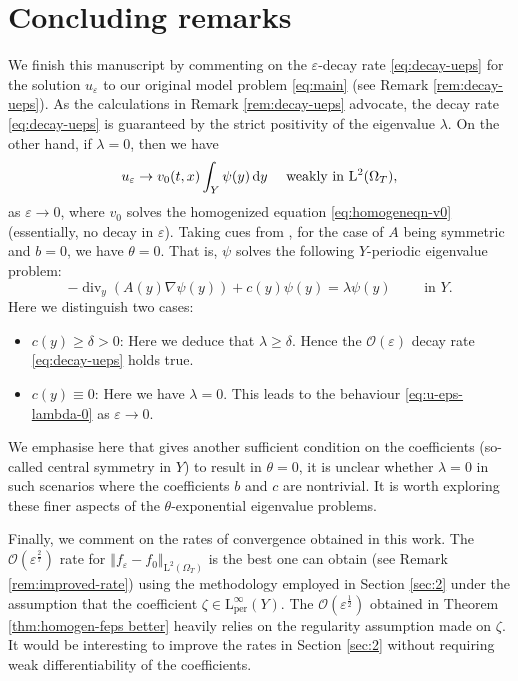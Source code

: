 \documentclass[preprint, 12pt]{amsart}
\numberwithin{equation}{section}
\numberwithin{equation}{section}
\newcommand{\eps}{\varepsilon}
\DeclareMathOperator{\dv}{div}
\begin{document}
\section{Concluding remarks}\label{sec:conclude}
We finish this manuscript by commenting on the $\eps$-decay rate \eqref{eq:decay-ueps} for the solution $u_\eps$ to our original model problem \eqref{eq:main} (see Remark \ref{rem:decay-ueps}). As the calculations in Remark \ref{rem:decay-ueps} advocate, the decay rate \eqref{eq:decay-ueps} is guaranteed by the strict positivity of the eigenvalue $\lambda$. On the other hand, if $\lambda=0$, then we have
\begin{equation}\label{eq:u-eps-lambda-0}
u_\eps \to v_0 (t,x) \int_Y \psi(y)\, {\rm d}y \quad \mbox{ weakly in }\mathrm L^2(\Omega_T),
\end{equation}
as $\eps\to0$, where $v_0$ solves the homogenized equation \eqref{eq:homogeneqn-v0} (essentially, no decay in $\eps$). Taking cues from \cite[Remark 2.2, page 737]{allaire2007homogenization}, for the case of $A$ being symmetric and $b=0$, we have $\theta=0$. That is, $\psi$ solves the following $Y$-periodic eigenvalue problem:
\[
-\dv_y ({A}(y)\nabla \psi(y)) + c(y) \psi(y) = \lambda \psi(y) \qquad \mbox{ in }Y.
\]
Here we distinguish two cases:
\begin{itemize}
\item $c(y)\ge \delta >0$: Here we deduce that $\lambda\ge \delta$. Hence the $\mathcal{O}(\eps)$ decay rate \eqref{eq:decay-ueps} holds true.
\item $c(y)\equiv0$: Here we have $\lambda=0$. This leads to the behaviour \eqref{eq:u-eps-lambda-0} as $\eps\to0$.
\end{itemize}
We emphasise here that \cite[Remark 2.2, page 737]{allaire2007homogenization} gives another sufficient condition on the coefficients (so-called central symmetry in $Y$) to result in $\theta=0$, it is unclear whether $\lambda=0$ in such scenarios where the coefficients $b$ and $c$ are nontrivial. It is worth exploring these finer aspects of the $\theta$-exponential eigenvalue problems. 

Finally, we comment on the rates of convergence obtained in this work. The $\mathcal{O}(\eps^\frac27)$ rate for $\left \Vert f_\eps - f_0 \right\Vert_{\mathrm L^2(\Omega_T)}$ is the best one can obtain (see Remark \ref{rem:improved-rate}) using the methodology employed in Section \ref{sec:2} under the assumption that the coefficient $\zeta\in\mathrm L^\infty_{\text{per}}(Y)$. The $\mathcal{O}(\eps^\frac12)$ obtained in Theorem \ref{thm:homogen-feps better} heavily relies on the regularity assumption made on $\zeta$. It would be interesting to improve the rates in Section \ref{sec:2} without requiring weak differentiability of the coefficients. 
\end{document}
